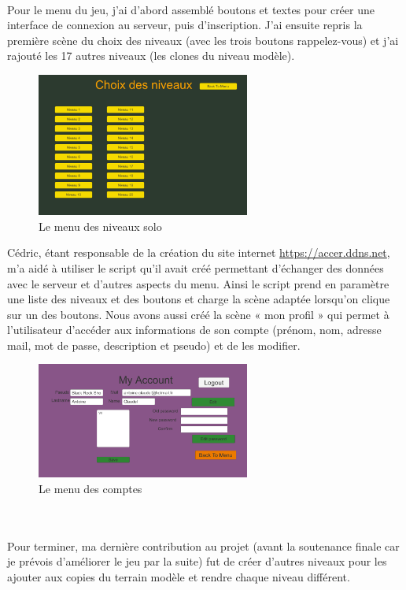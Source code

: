 \documentclass[titlepage, 13px, a4paper]{report}
\begin{document}
\paragraph*{} \hspace{0pt} 
Pour le menu du jeu, j'ai d'abord assemblé boutons et textes pour créer une
interface de connexion au serveur, puis d'inscription. J'ai ensuite repris la première
scène du choix des niveaux (avec les trois boutons rappelez-vous) et j'ai rajouté
les 17 autres niveaux (les clones du niveau modèle). 
\newpage
\begin{figure}
  \centering
  \includegraphics[width=7cm]{images/antoine_choixniveau.png}
  \caption{Le menu des niveaux solo}
\end{figure}

Cédric, étant responsable de la création du site internet \url{https://accer.ddns.net}, 
m'a aidé à utiliser le script qu'il avait créé permettant 
d'échanger des données avec le serveur et d'autres aspects du menu. Ainsi le script prend
en paramètre une liste des niveaux et des boutons et charge la scène adaptée
lorsqu'on clique sur un des boutons. Nous avons aussi créé la scène « mon
profil » qui permet à l'utilisateur d'accéder aux informations de son compte
(prénom, nom, adresse mail, mot de passe, description et pseudo) et de les
modifier. 
\begin{figure}
  \centering
  \includegraphics[width=7cm]{images/antoine_myaccount.png}
  \caption{Le menu des comptes}
\end{figure}
\\

\paragraph*{} \hspace{0pt} 
Pour terminer, ma dernière contribution au projet (avant la soutenance finale car je
prévois d'améliorer le jeu par la suite) fut de créer d'autres niveaux pour les
ajouter aux copies du terrain modèle et rendre chaque niveau différent. \\
\end{document}
